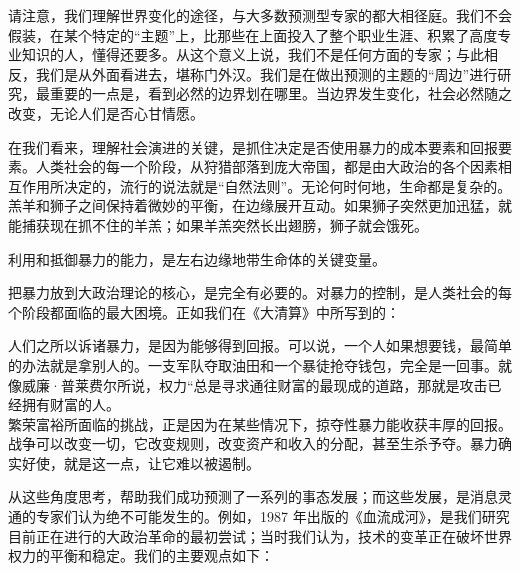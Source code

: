 请注意，我们理解世界变化的途径，与大多数预测型专家的都大相径庭。我们不会假装，在某个特定的“主题”上，比那些在上面投入了整个职业生涯、积累了高度专业知识的人，懂得还要多。从这个意义上说，我们不是任何方面的专家；与此相反，我们是从外面看进去，堪称门外汉。我们是在做出预测的主题的“周边”进行研究，最重要的一点是，看到必然的边界划在哪里。当边界发生变化，社会必然随之改变，无论人们是否心甘情愿。


在我们看来，理解社会演进的关键，是抓住决定是否使用暴力的成本要素和回报要素。人类社会的每一个阶段，从狩猎部落到庞大帝国，都是由大政治的各个因素相互作用所决定的，流行的说法就是“自然法则”。无论何时何地，生命都是复杂的。羔羊和狮子之间保持着微妙的平衡，在边缘展开互动。如果狮子突然更加迅猛，就能捕获现在抓不住的羊羔；如果羊羔突然长出翅膀，狮子就会饿死。


利用和抵御暴力的能力，是左右边缘地带生命体的关键变量。


把暴力放到大政治理论的核心，是完全有必要的。对暴力的控制，是人类社会的每个阶段都面临的最大困境。正如我们在《大清算》中所写到的：

\begin{tcolorbox}

人们之所以诉诸暴力，是因为能够得到回报。可以说，一个人如果想要钱，最简单的办法就是拿别人的。一支军队夺取油田和一个暴徒抢夺钱包，完全是一回事。就像威廉·普莱费尔所说，权力“总是寻求通往财富的最现成的道路，那就是攻击已经拥有财富的人。\\

繁荣富裕所面临的挑战，正是因为在某些情况下，掠夺性暴力能收获丰厚的回报。战争可以改变一切，它改变规则，改变资产和收入的分配，甚至生杀予夺。暴力确实好使，就是这一点，让它难以被遏制。

\end{tcolorbox}

从这些角度思考，帮助我们成功预测了一系列的事态发展；而这些发展，是消息灵通的专家们认为绝不可能发生的。例如，1987 年出版的《血流成河》，是我们研究目前正在进行的大政治革命的最初尝试；当时我们认为，技术的变革正在破坏世界权力的平衡和稳定。我们的主要观点如下：

